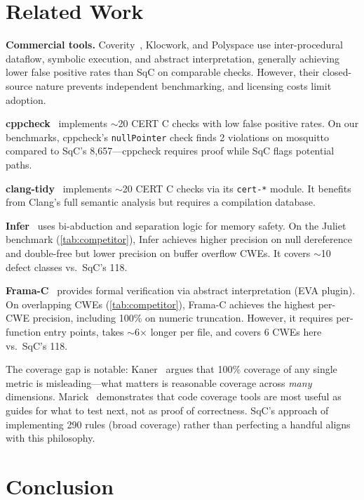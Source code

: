 \documentclass[10pt,twocolumn,letterpaper]{article}
\begin{document}
\section{Related Work}
\label{sec:related}

\textbf{Commercial tools.}
Coverity~\cite{coverity}, Klocwork, and Polyspace use inter-procedural
dataflow, symbolic execution, and abstract interpretation, generally
achieving lower false positive rates than SqC on comparable checks.
However, their closed-source nature prevents independent benchmarking,
and licensing costs limit adoption.

\textbf{cppcheck}~\cite{cppcheck} implements $\sim$20 CERT C checks
with low false positive rates.  On our benchmarks, cppcheck's
\texttt{nullPointer} check finds 2 violations on mosquitto compared
to SqC's 8,657---cppcheck requires proof while SqC flags potential
paths.

\textbf{clang-tidy}~\cite{clang-tidy} implements $\sim$20 CERT C
checks via its \texttt{cert-*} module.  It benefits from Clang's full
semantic analysis but requires a compilation database.

\textbf{Infer}~\cite{infer} uses bi-abduction and separation logic
for memory safety.  On the Juliet benchmark (\cref{tab:competitor}),
Infer achieves higher precision on null dereference and double-free
but lower precision on buffer overflow CWEs.  It covers $\sim$10
defect classes vs.\ SqC's 118.

\textbf{Frama-C}~\cite{frama-c} provides formal verification via
abstract interpretation (EVA plugin).  On overlapping CWEs
(\cref{tab:competitor}), Frama-C achieves the highest per-CWE
precision, including 100\% on numeric truncation.  However, it
requires per-function entry points, takes $\sim$6$\times$ longer per
file, and covers 6 CWEs here vs.\ SqC's 118.

The coverage gap is notable: Kaner~\cite{kaner} argues that 100\%
coverage of any single metric is misleading---what matters is
reasonable coverage across \emph{many} dimensions.
Marick~\cite{marick} demonstrates that code coverage tools are
most useful as guides for what to test next, not as proof of
correctness.  SqC's approach of implementing 290 rules (broad
coverage) rather than perfecting a handful aligns with this
philosophy.

\section{Conclusion}
\label{sec:conclusion}
\end{document}
